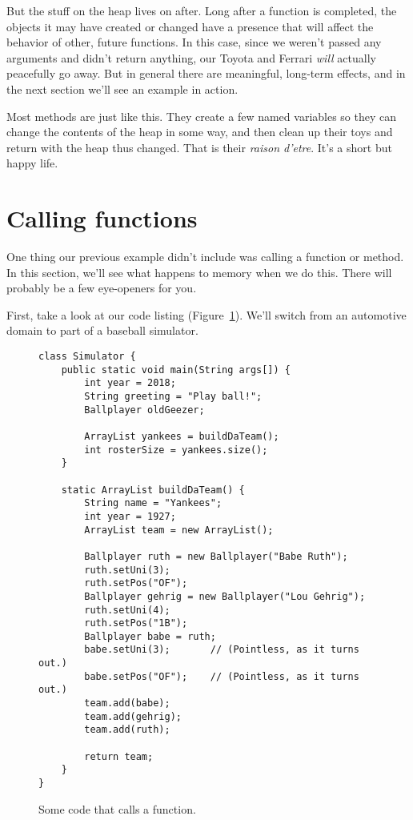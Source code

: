 But the stuff on the heap lives on after. Long after a function is completed,
the objects it may have created or changed have a presence that will affect
the behavior of other, future functions. In this case, since we weren't passed
any arguments and didn't return anything, our Toyota and Ferrari \textit{will}
actually peacefully go away. But in general there are meaningful, long-term
effects, and in the next section we'll see an example in action.

Most methods are just like this. They create a few named variables so they can
change the contents of the heap in some way, and then clean up their toys
and return with the heap thus changed. That is their \textit{raison d'etre}.
It's a short but happy life.


\section{Calling functions}

One thing our previous example didn't include was calling a function or
method. In this section, we'll see what happens to memory when we do this.
There will probably be a few eye-openers for you.

First, take a look at our code listing (Figure~\ref{fig:functionCode}). We'll
switch from an automotive domain to part of a baseball simulator.

\begin{figure}
\centering
\begin{Verbatim}[fontsize=\footnotesize,samepage=true,frame=single]
class Simulator {
    public static void main(String args[]) {
        int year = 2018;
        String greeting = "Play ball!";
        Ballplayer oldGeezer;

        ArrayList yankees = buildDaTeam();
        int rosterSize = yankees.size();
    }

    static ArrayList buildDaTeam() {
        String name = "Yankees";
        int year = 1927;
        ArrayList team = new ArrayList();

        Ballplayer ruth = new Ballplayer("Babe Ruth");
        ruth.setUni(3);
        ruth.setPos("OF");
        Ballplayer gehrig = new Ballplayer("Lou Gehrig");
        ruth.setUni(4);
        ruth.setPos("1B");
        Ballplayer babe = ruth;
        babe.setUni(3);       // (Pointless, as it turns out.)
        babe.setPos("OF");    // (Pointless, as it turns out.)
        team.add(babe);
        team.add(gehrig);
        team.add(ruth);
        
        return team;
    }
}
\end{Verbatim}
\caption{Some code that calls a function.}
\label{fig:functionCode}
\end{figure}

